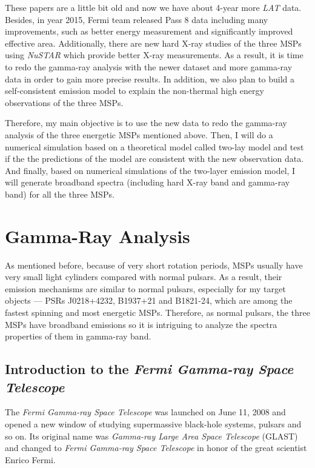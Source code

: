 \documentclass[12pt]{report}
\begin{document}
    These papers are a little bit old and now we have about 4-year more \textit{LAT} data. 
    Besides, in year 2015, Fermi team released Pass 8 data including many improvements, 
    such as better energy measurement and significantly improved effective area. 
    Additionally, there are new hard X-ray studies of the three MSPs using \textit{NuSTAR}
    which provide better X-ray measurements.
    As a result, it is time to redo the gamma-ray analysis with the newer dataset and
    more gamma-ray data in order to gain more precise results. In addition, we also plan to 
    build a self-consistent emission model to explain the non-thermal high energy
    observations of the three MSPs. 

    Therefore, my main objective is to use the new data to redo the gamma-ray
    analysis of the three energetic MSPs mentioned above. Then, I will do a numerical
    simulation based on a theoretical model called two-lay model and test if the the 
    predictions of the model are consistent with the new observation data. And finally, based 
    on numerical simulations of the two-layer emission model, I will generate broadband 
    spectra (including hard X-ray band and gamma-ray band) for all the three MSPs. 

    
\chapter{Gamma-Ray Analysis}
  As mentioned before, because of very short rotation periods, MSPs usually have very small 
  light cylinders compared with normal pulsars. As a result, their emission mechanisms are 
  similar to normal pulsars, especially for my target objects --- PSRs J0218+4232, B1937+21 
  and B1821-24, which are among the fastest spinning and most energetic MSPs. Therefore, 
  as normal pulsars, the three MSPs have broadband emissions so it is intriguing to analyze 
  the spectra properties of them in gamma-ray band.

  \section{Introduction to the \textit{Fermi Gamma-ray Space Telescope}}
    The \textit{Fermi Gamma-ray Space Telescope} was launched on June 11, 2008 and opened 
    a new window of studying supermassive black-hole systems, pulsars and so on. Its 
    original name was \textit{Gamma-ray Large Area Space Telescope} (GLAST) and changed 
    to \textit{Fermi Gamma-ray Space Telescope} in honor of the great scientist Enrico Fermi. 
\end{document}
